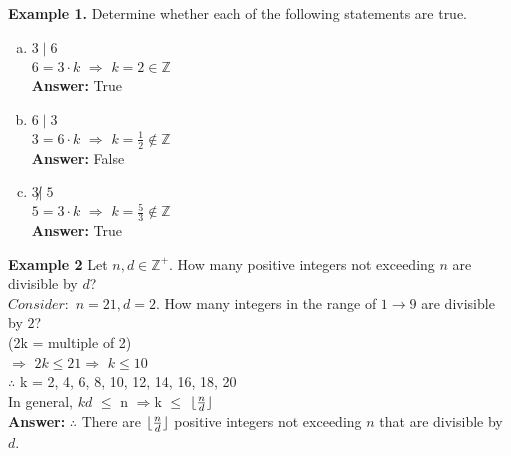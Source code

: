 \documentclass [12pt]{article}
\DeclarePairedDelimiter\floor{\lfloor}{\rfloor}
\begin{document}
\raggedright
\textbf{Example 1.} Determine whether each of the following statements are true.
\vspace{0.1in}
\begin{enumerate}[(a)]
\item $3\;| \;6$ \\
$6 = 3 \cdot k$ \quad $\Rightarrow$ \quad$k = 2 \in \mathbb{Z}$\\
\textbf{Answer:} True\\
\vspace{0.1in}
\item $6\;| \;3$ \\
$3 = 6 \cdot k$ \quad $\Rightarrow$ \quad$k = \frac{1}{2} \notin \mathbb{Z}$\\
\textbf{Answer:} False\\
\vspace{0.1in}
\item $3 \not | \; 5$\\
$5 = 3 \cdot k$ \quad $\Rightarrow$ \quad$k = \frac{5}{3} \notin \mathbb{Z}$\\
\textbf{Answer:} True\\
\end{enumerate}
\raggedright
\textbf{Example 2} Let $n, d \in \mathbb{Z}^{+}$. How many positive integers not exceeding $n$ are divisible by $d$?\\
\quad $Consider:$ $n = 21, d = 2$. How many integers in the range of $1 \to 9$ are divisible by $2$?\\
\quad \quad(2k = multiple of 2)\\
\quad \quad $\Rightarrow$ \quad $2k \leq 21$\quad  $\Rightarrow$ \quad $k \leq 10$\\
\quad \quad $\therefore$ k = 2, 4, 6, 8, 10, 12, 14, 16, 18, 20\vspace{0.15in}\\
\quad  In general, $kd$ $\leq$ n \quad $\Rightarrow$\quad k $\leq$ $\floor{\frac{n}{d}}$\vspace{0.15in}\\
\quad \textbf{Answer: }$\therefore$ There are $\floor{\frac{n}{d}}$ positive integers not exceeding $n$ that are divisible by $d$.
\vspace{0.25in}
\end{document}
